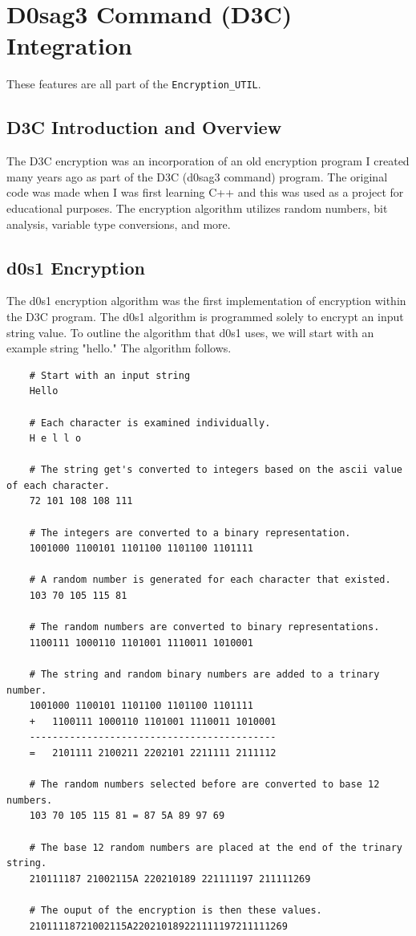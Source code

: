 \section{D0sag3 Command (D3C) Integration} \label{D3C}

These features are all part of the \texttt{Encryption\_UTIL}.

\subsection{D3C Introduction and Overview}

The D3C encryption was an incorporation of an old encryption program I created many years ago as part of the D3C (d0sag3 command) program. The original code was made when I was first learning C++ and this was used as a project for educational purposes. The encryption algorithm utilizes random numbers, bit analysis, variable type conversions, and more. 

\subsection{d0s1 Encryption}

The d0s1 encryption algorithm was the first implementation of encryption within the D3C program. The d0s1 algorithm is programmed solely to encrypt an input string value. To outline the algorithm that d0s1 uses, we will start with an example string "hello." The algorithm follows.

\begin{lstlisting}
	# Start with an input string
	Hello

	# Each character is examined individually.
	H e l l o

	# The string get's converted to integers based on the ascii value of each character.
	72 101 108 108 111

	# The integers are converted to a binary representation.
	1001000 1100101 1101100 1101100 1101111

	# A random number is generated for each character that existed.
	103 70 105 115 81

	# The random numbers are converted to binary representations.
	1100111 1000110 1101001 1110011 1010001

	# The string and random binary numbers are added to a trinary number.
	1001000 1100101 1101100 1101100 1101111
	+	1100111 1000110 1101001 1110011 1010001
	-------------------------------------------
	=	2101111 2100211 2202101 2211111 2111112

	# The random numbers selected before are converted to base 12 numbers.
	103 70 105 115 81 = 87 5A 89 97 69

	# The base 12 random numbers are placed at the end of the trinary string.
	210111187 21002115A 220210189 221111197 211111269

	# The ouput of the encryption is then these values.
	21011118721002115A220210189221111197211111269
\end{lstlisting}


